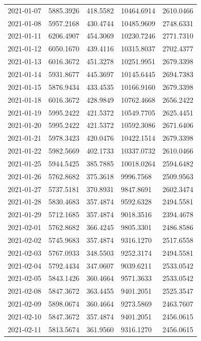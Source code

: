 {\begin{longtable}{lllll}
2021-01-07 & 5885.3926 & 418.5582 & 10464.6914 & 2610.0466 \\
2021-01-08 & 5957.2168 & 430.4744 & 10485.9609 & 2748.6331 \\
2021-01-11 & 6206.4907 & 454.3069 & 10230.7246 & 2771.7310 \\
2021-01-12 & 6050.1670 & 439.4116 & 10315.8037 & 2702.4377 \\
2021-01-13 & 6016.3672 & 451.3278 & 10251.9951 & 2679.3398 \\
2021-01-14 & 5931.8677 & 445.3697 & 10145.6445 & 2694.7383 \\
2021-01-15 & 5876.9434 & 433.4535 & 10166.9160 & 2679.3398 \\
2021-01-18 & 6016.3672 & 428.9849 & 10762.4668 & 2656.2422 \\
2021-01-19 & 5995.2422 & 421.5372 & 10549.7705 & 2625.4451 \\
2021-01-20 & 5995.2422 & 421.5372 & 10592.3086 & 2671.6406 \\
2021-01-21 & 5978.3423 & 420.0476 & 10422.1514 & 2679.3398 \\
2021-01-22 & 5982.5669 & 402.1733 & 10337.0732 & 2610.0466 \\
2021-01-25 & 5944.5425 & 385.7885 & 10018.0264 & 2594.6482 \\
2021-01-26 & 5762.8682 & 375.3618 & 9996.7568 & 2509.9563 \\
2021-01-27 & 5737.5181 & 370.8931 & 9847.8691 & 2602.3474 \\
2021-01-28 & 5830.4683 & 357.4874 & 9592.6328 & 2494.5581 \\
2021-01-29 & 5712.1685 & 357.4874 & 9018.3516 & 2394.4678 \\
2021-02-01 & 5762.8682 & 366.4245 & 9805.3301 & 2486.8586 \\
2021-02-02 & 5745.9683 & 357.4874 & 9316.1270 & 2517.6558 \\
2021-02-03 & 5767.0933 & 348.5503 & 9252.3174 & 2494.5581 \\
2021-02-04 & 5792.4434 & 347.0607 & 9039.6211 & 2533.0542 \\
2021-02-05 & 5843.1426 & 360.4664 & 9571.3633 & 2533.0542 \\
2021-02-08 & 5847.3672 & 363.4455 & 9401.2051 & 2525.3547 \\
2021-02-09 & 5898.0674 & 360.4664 & 9273.5869 & 2463.7607 \\
2021-02-10 & 5847.3672 & 357.4874 & 9401.2051 & 2456.0615 \\
2021-02-11 & 5813.5674 & 361.9560 & 9316.1270 & 2456.0615 \\

\end{longtable}}
